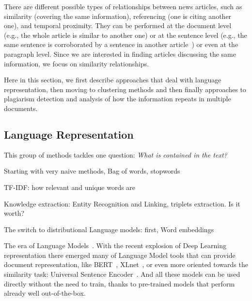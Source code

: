 There are different possible types of relationships between news articles, such as similarity (covering the same information), referencing (one is citing another one), and temporal proximity. They can be performed at the document level (e.g., the whole article is similar to another one) or at the sentence level (e.g., the same sentence is corroborated by a sentence in another article~\cite{bountouridis2018explaining}) or even at the paragraph level.
Since we are interested in finding articles discussing the same information, we focus on similarity relationships.

Here in this section, we first describe approaches that deal with language representation, then moving to clustering methods and then finally approaches to plagiarism detection and analysis of how the information repeats in multiple documents.

\subsection{Language Representation}
\label{ssec:lit_relationships_representation}

This group of methods tackles one question: \emph{What is contained in the text?}

Starting with very naive methods,
Bag of words, stopwords

TF-IDF: how relevant and unique words are\cite{jones1972statistical}

Knowledge extraction: Entity Recognition and Linking, triplets extraction. Is it worth?

The switch to distributional Language models:
first, Word embeddings

The era of Language Models~\cite{devlin2018bert,cer2018universal,yang2019xlnet}.
With the recent explosion of Deep Learning representation there emerged many of Language Model tools that can provide document representation, like BERT~\cite{devlin2018bert}, XLnet~\cite{yang2019xlnet}, or even more oriented towards the similarity task: Universal Sentence Encoder~\cite{cer2018universal}.
And all these models can be used directly without the need to train, thanks to pre-trained models that perform already well out-of-the-box.

